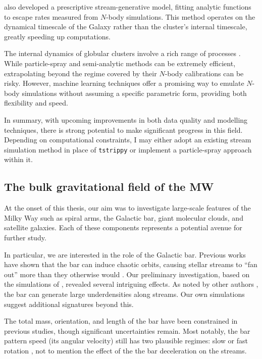         \citet{2015MNRAS.452..301F} also developed a prescriptive stream-generative model, fitting analytic functions to escape rates measured from $N$-body simulations. This method operates on the dynamical timescale of the Galaxy rather than the cluster's internal timescale, greatly speeding up computations.  

        The internal dynamics of globular clusters involve a rich range of processes \citep{1997A&ARv...8....1M}. While particle-spray and semi-analytic methods can be extremely efficient, extrapolating beyond the regime covered by their $N$-body calibrations can be risky. However, machine learning techniques \citep{2023ApJ...959...99T} offer a promising way to emulate $N$-body simulations without assuming a specific parametric form, providing both flexibility and speed.

        In summary, with upcoming improvements in both data quality and modelling techniques, there is strong potential to make significant progress in this field. Depending on computational constraints, I may either adopt an existing stream simulation method in place of \texttt{tstrippy} or implement a particle-spray approach within it.

    \subsection{The bulk gravitational field of the MW}
        At the onset of this thesis, our aim was to investigate large-scale features of the Milky Way such as spiral arms, the Galactic bar, giant molecular clouds, and satellite galaxies. Each of these components represents a potential avenue for further study.  

        In particular, we are interested in the role of the Galactic bar. Previous works have shown that the bar can induce chaotic orbits, causing stellar streams to ``fan out'' more than they otherwise would \citep{2016ApJ...824..104P,2020ApJ...889...70B}. Our preliminary investigation, based on the simulations of \citet{2023A&A...673A..44F}, revealed several intriguing effects. As noted by other authors \citep[see Fig.~9 of][]{2025NewAR.10001713B}, the bar can generate large underdensities along streams. Our own simulations suggest additional signatures beyond this.  

        The total mass, orientation, and length of the bar have been constrained in previous studies, though significant uncertainties remain. Most notably, the bar pattern speed (its angular velocity) still has two plausible regimes: slow or fast rotation \citep{2015MNRAS.450.4050W,2016ARA&A..54..529B,2023MNRAS.520.4779L,2024MNRAS.528.3576V}, not to mention the effect of the the bar deceleration \citep{2024A&A...690A.147H} on the streams. 

